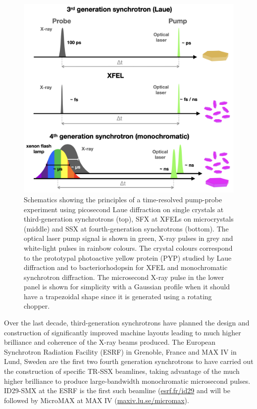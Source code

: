 \begin{figure}[H] %
    \centering
    \noindent \includegraphics[width=\textwidth]{images/Spectroscopy/TRicOS_Fig1.pdf}
    \hfill
    \caption{Schematics showing the principles of a time-resolved pump-probe experiment using picosecond Laue diffraction on single crystals at third-generation synchrotrons (top), SFX at XFELs on microcrystals (middle) and SSX at fourth-generation synchrotrons (bottom). The optical laser pump signal is shown in green, X-ray pulses in grey and white-light pulses in rainbow colours. The crystal colours correspond to the prototypal photoactive yellow protein (PYP) studied by Laue diffraction and to bacteriorhodopsin for XFEL and monochromatic synchrotron diffraction. The microsecond X-ray pulse in the lower panel is shown for simplicity with a Gaussian profile when it should have a trapezoidal shape since it is generated using a rotating chopper.}
    \label{fig:TRicOS_pumpprobe}
\end{figure}
Over the last decade, third-generation synchrotrons have planned the design and construction of significantly improved machine layouts leading to much higher brilliance and coherence of the X-ray beams produced. The European Synchrotron Radiation Facility (ESRF) in Grenoble, France and MAX IV in Lund, Sweden are the first two fourth generation synchrotrons to have carried out the construction of specific TR-SSX beamlines, taking advantage of the much higher brilliance to produce large-bandwidth monochromatic microsecond pulses. ID29-SMX at the ESRF is the first such beamline (\href{https://www.esrf.fr/id29}{esrf.fr/id29} and will be followed by MicroMAX at MAX IV (\href{https://www.maxiv.lu.se/micromax}{maxiv.lu.se/micromax}).
